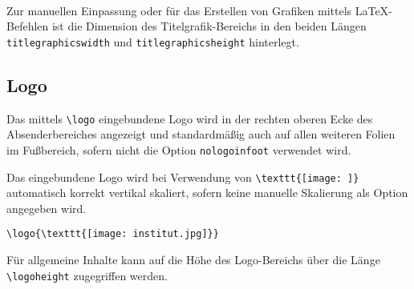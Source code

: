 \begin{Declaration}
  \\
\end{Declaration}

Zur manuellen Einpassung oder für das Erstellen von Grafiken mittels
\LaTeX-Befehlen ist die Dimension des Titelgrafik-Bereichs in den
beiden Längen \lstinline{titlegraphicswidth} und \lstinline{titlegraphicsheight}
hinterlegt.


\subsection{Logo}

\begin{Declaration}
\end{Declaration}

Das mittels \lstinline{\logo} eingebundene Logo wird in der rechten oberen
Ecke des Absenderbereiches angezeigt und standardmäßig auch auf allen weiteren
Folien im Fußbereich, sofern nicht die Option \lstinline{nologoinfoot}
verwendet wird.

Das eingebundene Logo wird bei Verwendung von \lstinline!\texttt{[image: ]}! 
automatisch korrekt vertikal skaliert,
sofern keine manuelle Skalierung als Option angegeben wird.


\begin{example}
\begin{lstlisting}
\logo{\texttt{[image: institut.jpg]}}
\end{lstlisting}
\end{example}

\begin{Declaration}
\end{Declaration}

Für allgemeine Inhalte kann auf die Höhe des Logo-Bereichs über die Länge
\lstinline{\logoheight} zugegriffen werden.



